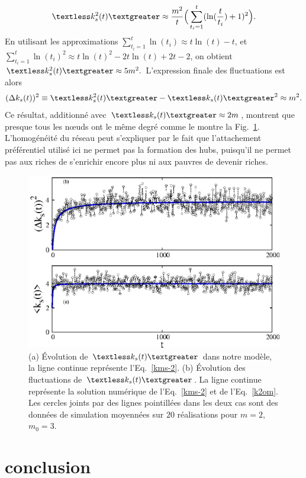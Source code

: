 \begin{eqnarray}
\begin{split}
\kmss\approx \frac{m^2}{t}\Big(\sum_{t_i=1}^t (\ln(\frac{t}{t_i})+1)^2\Big).
\label{k2om}
\end{split}
\end{eqnarray}
En utilisant les approximations  $\sum_{t_i=1}^t \ln(t_i)\approx t\ln(t)-t$, et
$\sum_{t_i=1}^t \ln(t_i)^2\approx t\ln(t)^2-2t\ln(t)+2t-2$, on obtient $\kmss\approx 5m^2.$ L'expression finale des fluctuations est alors 
\begin{eqnarray}
(\Delta k_s(t))^2 \equiv {\kmss-\kms^2}\approx m^2.
\end{eqnarray}
Ce résultat, additionné avec $\kms\approx 2m $, montrent que presque tous les nœuds ont le même degré comme le montre la Fig.~\ref{fig2b-2}. L'homogénéité du réseau peut s'expliquer par le fait que l'attachement préférentiel utilisé ici ne permet pas la formation des hubs, puisqu'il ne permet pas aux riches de s'enrichir encore plus ni aux pauvres de devenir riches. 
\begin{figure}[h]
	\centering
	\includegraphics[scale=1]{./figures/nfig3}
	\caption{(a) Évolution de $\kms$ dans notre modèle, la ligne continue représente l'Eq.~\eqref{kms-2}.
		(b) Évolution des fluctuations de $\kms$. La ligne continue représente la solution numérique de l'Eq.~\eqref{kms-2} et de l'Eq.~\eqref{k2om}. Les cercles joints par des lignes pointillées dans les deux cas sont des données de simulation moyennées sur $20$ réalisations pour $m=2$, $m_0=3$.}
	\label{fig2b-2}
\end{figure}
\vspace{4cm}
\section{conclusion}

